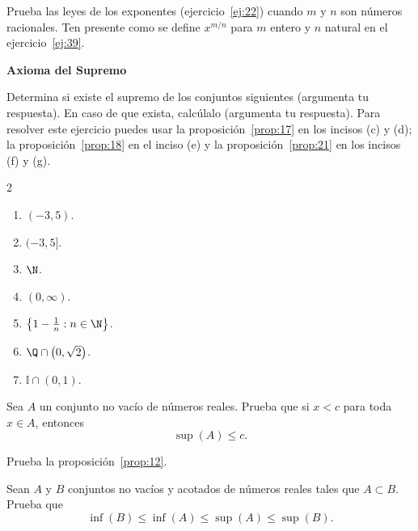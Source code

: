 \documentclass[12pt,a4paper]{book}
\newcommand{\I}{\mathbb{I}}
\newcommand{\subtitulo}[1]{\par\avoidorphan{5}\addvspace{\medskipamount}\noindent\textbf{#1}\par\nobreak}
\begin{document}
    \begin{ejercicio}\label{ej:40}
        Prueba las leyes de los exponentes (ejercicio~\ref{ej:22}) cuando $m$ y
        $n$ son números racionales. \sugerencia Ten presente como se define $x^{m/n}$
        para $m$ entero y $n$ natural en el ejercicio~\ref{ej:39}.
    \end{ejercicio}

    \subtitulo{Axioma del Supremo}

    \begin{ejercicio}\label{ej:41}
        Determina si existe el supremo de los conjuntos siguientes (argumenta
        tu respuesta). En caso de que exista, calcúlalo (argumenta tu respuesta).
        Para resolver este ejercicio puedes usar la proposición~\ref{prop:17} en los
        incisos (c) y (d); la proposición~\ref{prop:18} en el inciso (e) y la proposición~\ref{prop:21} en los
        incisos (f) y (g).
        \begin{multicols}{2}
        \begin{enumerate}[nosep]
            \item $(-3,5)$.
            \item $(-3,5]$.
            \item $\N$.
            \item $(0,\infty)$.
            \item $\left\{1-\frac{1}{n}:n\in\N\right\}$.
            \item $\Q\cap\left(0,\sqrt{2}\right)$.
            \item $\I\cap(0,1)$.
        \end{enumerate}
        \end{multicols}
    \end{ejercicio}

    \begin{ejercicio}\label{ej:42}
        Sea $A$ un conjunto no vacío de números reales. Prueba que si
        $x<c$ para toda $x\in A$, entonces
        \begin{equation*}
            \sup(A)\leq c.
        \end{equation*}
    \end{ejercicio}

    \begin{ejercicio}\label{ej:43}
        Prueba la proposición~\ref{prop:12}.
    \end{ejercicio}

    \begin{ejercicio}\label{ej:44}
        Sean $A$ y $B$ conjuntos no vacíos y acotados de números reales
        tales que $A\subset B$. Prueba que
        \begin{equation*}
            \inf(B)\leq\inf(A)\leq\sup(A)\leq\sup(B).
        \end{equation*}
    \end{ejercicio}
\end{document}
